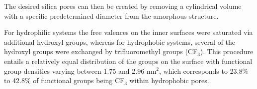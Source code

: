 \documentclass[AMA,STIX2COL]{WileyNJD-v2} %
\begin{document}
The desired silica pores can then be created by removing a cylindrical volume with a specific predetermined diameter from the amorphous structure.

For hydrophilic systems the free valences on the inner surfaces were saturated via additional hydroxyl groups, whereas for hydrophobic systems, several of the hydroxyl groups were exchanged by trifluoromethyl groups (CF$_{3}$). This procedure entails a relatively equal distribution of the groups on the surface with functional group densities varying between 1.75 and 2.96 nm$^{2}$, which corresponds to 23.8\% to 42.8\% of functional groups being CF$_{3}$ within hydrophobic pores.
\end{document}
